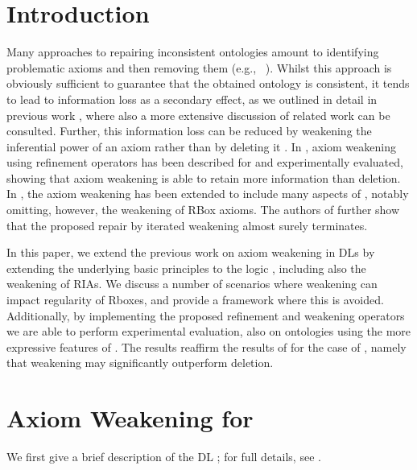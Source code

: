 \documentclass[
]{ceurart}
\begin{document}
\section{Introduction}

Many approaches to repairing inconsistent ontologies amount to identifying problematic axioms and then removing them (e.g., ~\cite{ScCo03,kalyanpur2005debugging,kalyanpur2006repairing,BaPS07}). Whilst this approach is obviously sufficient to guarantee that the obtained ontology is consistent, it tends to lead to information loss as a secondary effect, as we outlined in detail in previous work \cite{troquard2018repairing,confalonieri2020towards}, where also a more extensive discussion of related work can be consulted.   Further, this information loss can be reduced by weakening the inferential power of an axiom rather than by deleting it \cite{du2014practical,AMAI-2018,DBLP:conf/kr/BaaderKNP18,troquard2018repairing,confalonieri2020towards}. 
%
In \cite{troquard2018repairing}, axiom weakening using refinement operators has been described for \ALC and experimentally evaluated, showing that axiom weakening is able to retain more information than deletion. In \cite{confalonieri2020towards}, the axiom weakening has been extended to include many aspects of \SROIQ, notably omitting, however, the weakening of RBox axioms. The authors of \cite{confalonieri2020towards} further show that the proposed repair by iterated weakening almost surely terminates. 

In this  paper, we extend the previous work on axiom weakening in DLs by extending the underlying basic principles to the logic \SROIQ, including also the weakening of RIAs. We discuss a number of scenarios where weakening can impact regularity of \SROIQ Rboxes, and provide a framework where this is avoided. Additionally, by implementing the proposed refinement and weakening operators we are able to perform experimental evaluation, also on ontologies using the more expressive features of \SROIQ. The results reaffirm the results of \cite{troquard2018repairing} for the case of \SROIQ, namely that weakening may significantly outperform deletion.

\section{Axiom Weakening for \SROIQ}

\noindent
We first give a brief description of the DL \SROIQ; for full details, see \cite{HorrocksKutzSattlerKR2006,Kazakov08,baader_horrocks_lutz_sattler_2017}. 
\end{document}

